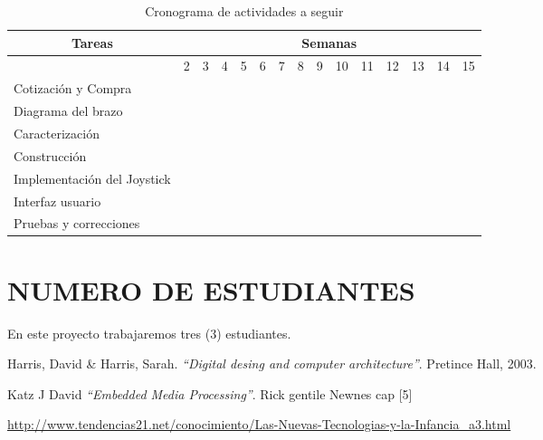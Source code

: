 \documentclass[10pt,graphicx,caption,rotating]{article}
\begin{document}
\begin{table}[H]
	\centering
\begin{tabular}{|l|c|c|c|c|c|c|c|c|c|c|c|c|c|c|}\hline
\multicolumn{1}{|c|}{Tareas} & \multicolumn{14}{|c|}{Semanas} \\ \hline
 & 2 & 3 & 4 & 5 & 6 & 7 & 8 & 9 & 10 & 11 & 12 & 13 & 14 & 15 \\ \hline
 Cotización y Compra & & \cellcolor{black} & \cellcolor{black} & & & & & & & & & & & \\ \hline
 Diagrama del brazo & & \cellcolor{black} & \cellcolor{black} & & & & & & & & & & & \\ \hline
 Caracterización & & & \cellcolor{black} & \cellcolor{black} & \cellcolor{black} & \cellcolor{black}  & & & & & & & & \\ \hline
 Construcción & & & & \cellcolor{black} & \cellcolor{black} & \cellcolor{black} & & & & & & & & \\ \hline
 Implementación del Joystick & & & & & & \cellcolor{black} & \cellcolor{black} & \cellcolor{black} & \cellcolor{black} & & & & & \\ \hline
 Interfaz usuario & & & & & & & & \cellcolor{black} & \cellcolor{black} & & & & & \\ \hline
 Pruebas y correcciones & & & & & & & & & \cellcolor{black} & \cellcolor{black} & & & & \\ \hline
    \end{tabular}
	\caption{Cronograma de actividades a seguir}
	\label{tab1}
\end{table}

\section{NUMERO DE ESTUDIANTES}
\noindent
En este proyecto trabajaremos tres ($3$) estudiantes.
  
\begin{thebibliography}{99}
 Harris, David \& Harris, Sarah.
{\em "`Digital desing and computer architecture"'}.
Pretince Hall, 2003.

 Katz J David
{\em "`Embedded Media Processing"'}.
Rick gentile Newnes cap [5]

 \url{http://www.tendencias21.net/conocimiento/Las-Nuevas-Tecnologias-y-la-Infancia_a3.html}

\end{thebibliography}
\end{document}
